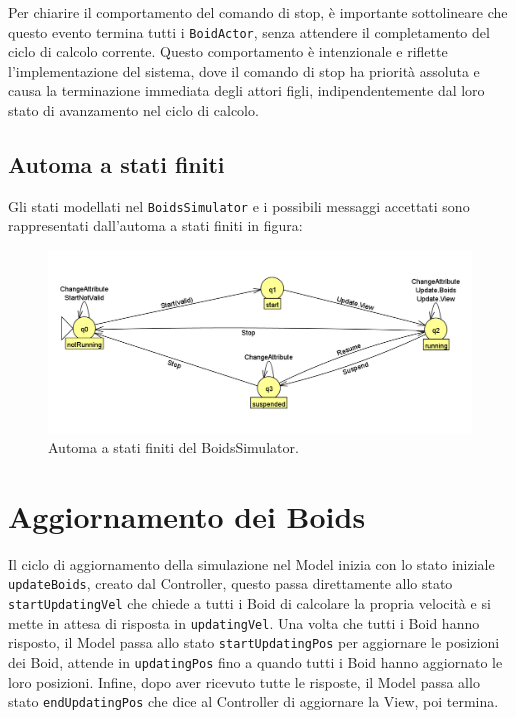 \documentclass[a4paper,12pt]{report}
\begin{document}
            Per chiarire il comportamento del comando di stop, è importante sottolineare che questo evento termina tutti i \texttt{BoidActor}, senza attendere il completamento del ciclo di calcolo corrente. Questo comportamento è intenzionale e riflette l'implementazione del sistema, dove il comando di stop ha priorità assoluta e causa la terminazione immediata degli attori figli, indipendentemente dal loro stato di avanzamento nel ciclo di calcolo.

        \subsection*{Automa a stati finiti}
            Gli stati modellati nel \texttt{BoidsSimulator} e i possibili messaggi accettati sono rappresentati dall'automa a stati finiti in figura:
            \begin{figure}[ht!]
                \centering
                \includegraphics[width=\textwidth]{img/FSM/Simulator.png}
                \caption{Automa a stati finiti del BoidsSimulator.}
                \label{fig:Boids_simulator_fsm}
            \end{figure}
    
    \section{Aggiornamento dei Boids}

        Il ciclo di aggiornamento della simulazione nel Model inizia con lo stato iniziale \texttt{updateBoids}, creato dal Controller, questo passa direttamente allo stato \texttt{startUpdatingVel} che chiede a tutti i Boid di calcolare la propria velocità e si mette in attesa di risposta in \texttt{updatingVel}. Una volta che tutti i Boid hanno risposto, il Model passa allo stato \texttt{startUpdatingPos} per aggiornare le posizioni dei Boid, attende in \texttt{updatingPos} fino a quando tutti i Boid hanno aggiornato le loro posizioni. 
        Infine, dopo aver ricevuto tutte le risposte, il Model passa allo stato \texttt{endUpdatingPos} che dice al Controller di aggiornare la View, poi termina.
        
\end{document}
